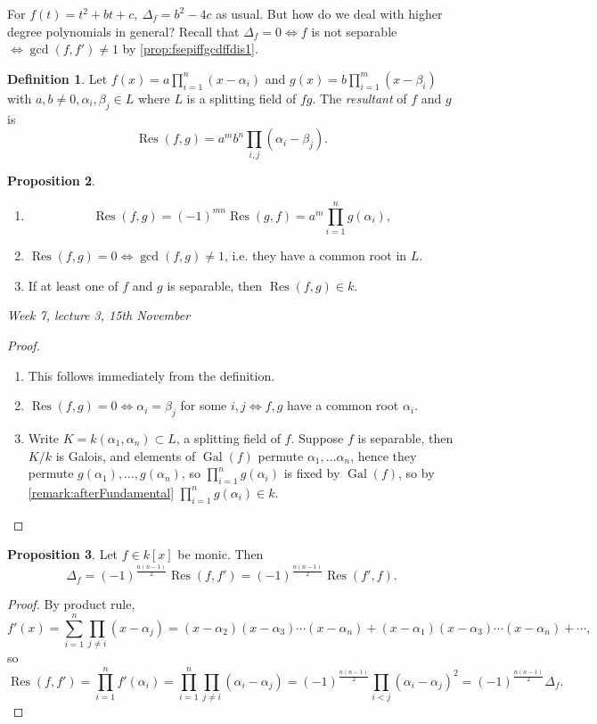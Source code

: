 \documentclass{article}
\newcommand{\Gal}{\operatorname{Gal}}
\newcommand{\Res}{\operatorname{Res}}
\theoremstyle{definition}
\newtheorem{defn}{Definition}[subsection]
\newtheorem{prop}[defn]{Proposition}
\begin{document}
For $f(t)=t^2+bt+c,\ \Delta_f=b^2-4c$ as usual. But how do we deal with higher degree polynomials in general? Recall that $\Delta_f=0\iff f$ is not separable $\iff \gcd(f,f')\neq 1$ by \ref{prop:fsepiffgcdffdis1}.

\begin{defn}
Let $f(x)=a\prod_{i=1}^n(x-\alpha_i)$ and $g(x)=b\prod_{i=1}^m(x-\beta_i)$ with $a,b\neq 0,\alpha_i,\beta_j\in L$ where $L$ is a splitting field of $fg$. The \textit{resultant} of $f$ and $g$ is
\[
\Res(f,g)=a^mb^n\prod_{i,j}(\alpha_i-\beta_j).
\]
\end{defn}
\begin{prop}
\begin{enumerate}
\item \[
\Res(f,g)=(-1)^{mn}\Res(g,f)=a^m\prod_{i=1}^n g(\alpha_i),
\]
\item $\Res(f,g)=0\iff \gcd(f,g)\neq 1$, i.e. they have a common root in $L$.
\item If at least one of $f$ and $g$ is separable, then $\Res(f,g)\in k$.
\end{enumerate}
\end{prop}

\begin{flushright}
\textit{Week 7, lecture 3, 15th November}
\end{flushright}

\begin{proof}
\begin{enumerate}
\item This follows immediately from the definition.
\item $\Res(f,g)=0\iff \alpha_i=\beta_j$ for some $i,j\iff f,g$ have a common root $\alpha_i$.
\item Write $K=k(\alpha_1,\alpha_n)\subset L$, a splitting field of $f$. Suppose $f$ is separable, then $K/k$ is Galois, and elements of $\Gal(f)$ permute $\alpha_1,\ldots\alpha_n$, hence they permute $g(\alpha_1),\ldots,g(\alpha_n)$, so $\prod_{i=1}^ng(\alpha_i)$ is fixed by $\Gal(f)$, so by \ref{remark:afterFundamental} $\prod_{i=1}^ng(\alpha_i)\in k$.
\end{enumerate}
\end{proof}

\begin{prop}
Let $f\in k[x]$ be monic. Then
\[
\Delta_f=(-1)^{\frac{n(n-1)}{2}}\Res(f,f')=(-1)^{\frac{n(n-1)}{2}}\Res(f',f).
\]
\end{prop}
\begin{proof}
By product rule,
\[
f'(x)=\sum_{i=1}^n\prod_{j\neq i}(x-\alpha_j)=(x-\alpha_2)(x-\alpha_3)\cdots(x-\alpha_n)+(x-\alpha_1)(x-\alpha_3)\cdots(x-\alpha_n)+\cdots,
\]
so
\[
\Res(f,f')=\prod_{i=1}^n f'(\alpha_i)=\prod_{i=1}^n\prod_{j\neq i}(\alpha_i-\alpha_j)=(-1)^{\frac{n(n-1)}{2}}\prod_{i<j}(\alpha_i-\alpha_j)^2=(-1)^{\frac{n(n-1)}{2}}\Delta_f.
\]
\end{proof}
\end{document}
